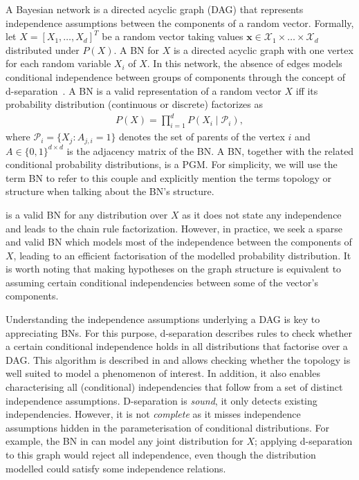 A Bayesian network is a directed acyclic graph (DAG) that represents independence assumptions between the components of a random vector. Formally, let $X = \left[X_1, \hdots, X_d\right]^T$ be a random vector taking values $\bm{x} \in \mathcal{X}_1 \times \dots \times \mathcal{X}_d$ distributed under $P(X)$. A BN for $X$ is a directed acyclic graph with one vertex for each random variable $X_i$ of $X$. In this network, the absence of edges models conditional independence between groups of components through the concept of d-separation~\citep{geiger_d-separation_1990}. A BN is a valid representation of a random vector $X$ iff its probability distribution (continuous or discrete) factorizes as
\begin{align}
    P(X) = \prod^d_{i=1}P(X_i\mid \mathcal{P}_i),\label{eq:BN-fact}
\end{align}
where  $\mathcal{P}_i = \{X_j: A_{j, i} = 1 \}$ denotes the set of parents of the vertex $i$ and $A \in \{0, 1\}^{d\times d}$ is the adjacency matrix of the BN. A BN, together with the related conditional probability distributions, is a PGM. For simplicity, we will use the term BN to refer to this couple and explicitly mention the terms topology or structure when talking about the BN's structure.

 is a valid BN for any distribution over $X$ as it does not state any independence and leads to the chain rule factorization. However, in practice, we seek a sparse and valid BN which models most of the independence between the components of $X$, leading to an efficient factorisation of the modelled probability distribution. It is worth noting that making hypotheses on the graph structure is equivalent to assuming certain conditional independencies between some of the vector's components.

Understanding the independence assumptions underlying a DAG is key to appreciating BNs. For this purpose, d-separation describes rules to check whether a certain conditional independence holds in all distributions that factorise over a DAG. This algorithm is described in  and allows checking whether the topology is well suited to model a phenomenon of interest. In addition, it also enables characterising all (conditional) independencies that follow from a set of distinct independence assumptions. D-separation is \textit{sound}, it only detects existing independencies. However, it is not \textit{complete} as it misses independence assumptions hidden in the parameterisation of conditional distributions. For example, the BN in  can model any joint distribution for $X$; applying d-separation to this graph would reject all independence, even though the distribution modelled could satisfy some independence relations.

